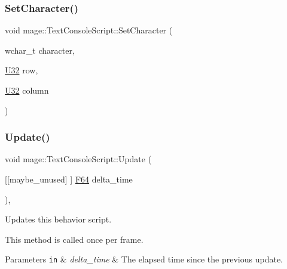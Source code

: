 \hypertarget{classmage_1_1_text_console_script_a49528daefb63dfc971bf5ad28ad86b55}{}\label{classmage_1_1_text_console_script_a49528daefb63dfc971bf5ad28ad86b55} 
\subsubsection{\texorpdfstring{Set\+Character()}{SetCharacter()}}
{\footnotesize\ttfamily void mage\+::\+Text\+Console\+Script\+::\+Set\+Character (\begin{DoxyParamCaption}\item[{wchar\+\_\+t}]{character,  }\item[{\hyperlink{namespacemage_a41c104c036fba3756a74e19f793eeaa1}{U32}}]{row,  }\item[{\hyperlink{namespacemage_a41c104c036fba3756a74e19f793eeaa1}{U32}}]{column }\end{DoxyParamCaption})\hspace{0.3cm}{\ttfamily [private]}}

\hypertarget{classmage_1_1_text_console_script_afc6fbebca3b5a3bf433777c93e6e27d6}{}\label{classmage_1_1_text_console_script_afc6fbebca3b5a3bf433777c93e6e27d6} 
\subsubsection{\texorpdfstring{Update()}{Update()}}
{\footnotesize\ttfamily void mage\+::\+Text\+Console\+Script\+::\+Update (\begin{DoxyParamCaption}\item[{\mbox{[}\mbox{[}maybe\+\_\+unused\mbox{]} \mbox{]} \hyperlink{namespacemage_ad26233bbec640deda836e572c1a23708}{F64}}]{delta\+\_\+time }\end{DoxyParamCaption})\hspace{0.3cm}{\ttfamily [override]}, {\ttfamily [virtual]}}

Updates this behavior script.

This method is called once per frame.


\begin{DoxyParams}[1]{Parameters}
\mbox{\tt in}  & {\em delta\+\_\+time} & The elapsed time since the previous update. \\
\hline
\end{DoxyParams}


